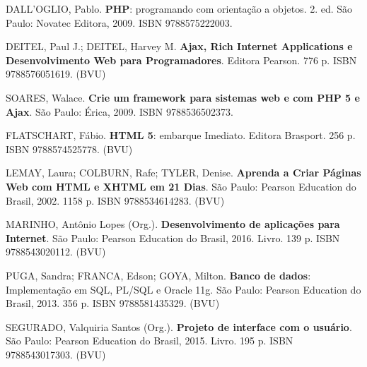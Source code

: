 \begin{pud}
	\begin{bibbasica}
			
        \item DALL'OGLIO, Pablo. \textbf{PHP}: programando com orientação a objetos. 2. ed. São Paulo: Novatec Editora, 2009.  ISBN 9788575222003.
		\item DEITEL, Paul J.; DEITEL, Harvey M.  \textbf{Ajax, Rich Internet Applications e Desenvolvimento Web para Programadores}. Editora Pearson. 776 p. ISBN 9788576051619. (BVU)
		\item SOARES, Walace. \textbf{Crie um framework para sistemas web e com PHP 5 e Ajax}. São Paulo: Érica, 2009.  ISBN 9788536502373.
		
	\end{bibbasica}
	
	\begin{bibcomplementar}
    
	    
		\item FLATSCHART, F\'abio. \textbf{HTML 5}: embarque Imediato. Editora Brasport. 256 p. ISBN 9788574525778. (BVU)
		\item LEMAY, Laura; COLBURN, Rafe; TYLER, Denise. \textbf{Aprenda a Criar P\'aginas Web com HTML e XHTML em 21 Dias}. São Paulo: Pearson Education do Brasil, 2002.  1158 p. ISBN 9788534614283. (BVU)
 		\item MARINHO, Antônio Lopes (Org.). \textbf{Desenvolvimento de aplicações para Internet}. São Paulo: Pearson Education do Brasil, 2016. Livro. 139 p. ISBN 9788543020112. (BVU)
 		
 		\item PUGA, Sandra; FRANCA, Edson; GOYA, Milton. \textbf{Banco de dados}: Implementa\c{c}\~ao em SQL, PL/SQL e Oracle 11g.  São Paulo: Pearson Education do Brasil, 2013. 356 p.  ISBN 9788581435329. (BVU)
 		\item SEGURADO, Valquiria Santos (Org.). \textbf{Projeto de interface com o usuário}. São Paulo: Pearson Education do Brasil, 2015. Livro. 195 p. ISBN 9788543017303. (BVU) 
		 
	\end{bibcomplementar}
	

\end{pud}





